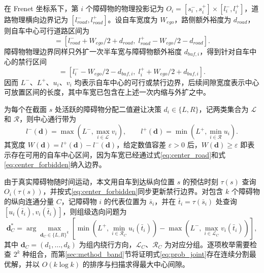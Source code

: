 \documentclass[a4paper,zihao=5]{ctexart}
\theoremstyle{definition}
\begin{document}
在 Frenet 坐标系下，第 $i$ 个障碍物的物理投影记为 $O_i=[s_i^{-},s_i^{+}]\times[l_i^{-},l_i^{+}]$，道路物理横向边界记为 $[l_{road}^{-},l_{road}^{+}]$。设自车宽度为 $W_{ego}$，路侧额外裕度为 $d_{road}$，则自车中心可行道路区间为
\begin{equation}
    [L^{-},L^{+}]=
    [l_{road}^{-}+W_{ego}/2+d_{road},\;l_{road}^{+}-W_{ego}/2-d_{road}].
    \label{eq:center_road}
\end{equation}
障碍物物理边界同样只外扩一次半车宽与障碍物额外裕度 $d_{buf,i}$，得到针对自车中心的禁行区间
\begin{equation}
    [u_i,v_i]=[l_i^{-}-W_{ego}/2-d_{buf,i},\;l_i^{+}+W_{ego}/2+d_{buf,i}].
    \label{eq:center_forbidden}
\end{equation}
因而 $L^{-}$、$L^{+}$、$u_i$、$v_i$ 均表示自车中心的可行或禁行边界，后续间隙宽度表示中心可放置区间的长度，其中车宽已包含在上述一次内缩与外扩之中。

为每个在截面 $s$ 处活跃的障碍物分配二值避让决策 $d_i\in\{L,R\}$，记两类集合为 $\mathcal L$ 和 $\mathcal R$，则中心通行带为
\begin{equation}
    l^{-}(\mathbf d)=\max\!\left(L^{-},\max_{i\in\mathcal L}v_i\right),\qquad
    l^{+}(\mathbf d)=\min\!\left(L^{+},\min_{i\in\mathcal R}u_i\right).
    \label{eq:center_band}
\end{equation}
其宽度 $W(\mathbf d)=l^{+}(\mathbf d)-l^{-}(\mathbf d)$，给定数值容差 $\varepsilon>0$ 后，$W(\mathbf d)\geq\varepsilon$ 即表示存在可用的自车中心区间，因为车宽已经通过式\eqref{eq:center_road}和式\eqref{eq:center_forbidden}纳入边界。

由于真实障碍物随时间运动，本文用自车到达纵向位置 $s$ 的预估时刻 $\tau(s)$ 查询 $O_i(\tau(s))$，并按式\eqref{eq:center_forbidden}同步更新禁行边界。对包含 $k$ 个障碍物的纵向连通分量 $C$，记障碍物 $i$ 的代表位置为 $\bar s_i$，并在 $\bar t_i=\tau(\bar s_i)$ 处查询 $[u_i(\bar t_i),v_i(\bar t_i)]$，则组级选向问题为
\begin{equation}
    \mathbf{d}_{C}^{*} = \arg\max_{\mathbf{d}_{C}\in\{L,R\}^{k}}
    \left[\min\!\left(L^{+},\min_{i\in\mathcal R_C}u_i(\bar t_i)\right)
    -\max\!\left(L^{-},\max_{i\in\mathcal L_C}v_i(\bar t_i)\right)\right],
    \label{eq:prob_joint}
\end{equation}
其中 $\mathbf d_C=(d_1,\ldots,d_k)$ 为组内绕行方向，$\mathcal L_C$、$\mathcal R_C$ 为对应分组。逐项枚举需要检查 $2^k$ 种组合，而第\ref{sec:method_band}节将证明式\eqref{eq:prob_joint}存在连续分割最优解，并以 $O(k\log k)$ 的排序与扫描求得最大中心间隙。

\label{subsec:union_projection}
\end{document}
